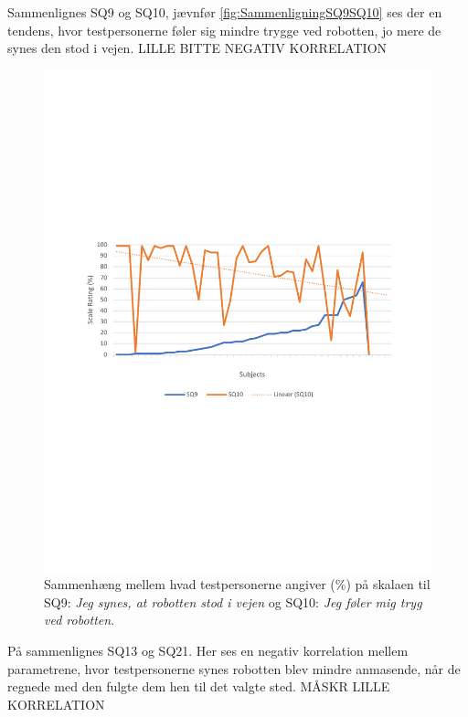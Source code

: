 Sammenlignes SQ9 og SQ10, jævnfør \autoref{fig:SammenligningSQ9SQ10} ses der en tendens, hvor testpersonerne føler sig mindre trygge ved robotten, jo mere de synes den stod i vejen. LILLE BITTE NEGATIV KORRELATION

%
\begin{figure}[H]
	\centering
	\includegraphics[width=\textwidth]{Figure/Korrelationsgrafer/SQ9+SQ10}
	\caption{Sammenhæng mellem hvad testpersonerne angiver (\%) på skalaen til SQ9: \textit{Jeg synes, at robotten stod i vejen} og SQ10: \textit{Jeg føler mig tryg ved robotten}.}
	\label{fig:SammenligningSQ9SQ10}
\end{figure}
\noindent
%
På  sammenlignes SQ13 og SQ21. Her ses en negativ korrelation mellem parametrene, hvor testpersonerne synes robotten blev mindre anmasende, når de regnede med den fulgte dem hen til det valgte sted. MÅSKR LILLE KORRELATION
%
